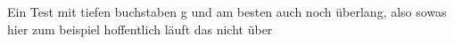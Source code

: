 \documentclass[preview]{standalone}
\begin{document}
Ein Test mit tiefen buchstaben g und am besten auch noch überlang, also sowas hier zum beispiel hoffentlich läuft das nicht über\\
\end{document}
